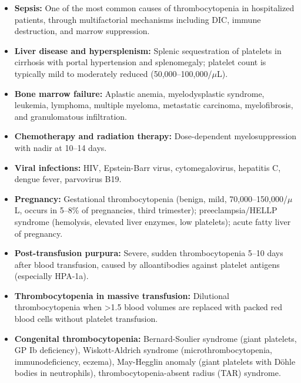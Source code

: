 \begin{itemize}
  \item \textbf{Sepsis:} One of the most common causes of thrombocytopenia in hospitalized patients, through multifactorial mechanisms including DIC, immune destruction, and marrow suppression.
  \item \textbf{Liver disease and hypersplenism:} Splenic sequestration of platelets in cirrhosis with portal hypertension and splenomegaly; platelet count is typically mild to moderately reduced (50,000--100,000/$\mu$L).
  \item \textbf{Bone marrow failure:} Aplastic anemia, myelodysplastic syndrome, leukemia, lymphoma, multiple myeloma, metastatic carcinoma, myelofibrosis, and granulomatous infiltration.
  \item \textbf{Chemotherapy and radiation therapy:} Dose-dependent myelosuppression with nadir at 10--14 days.
  \item \textbf{Viral infections:} HIV, Epstein-Barr virus, cytomegalovirus, hepatitis C, dengue fever, parvovirus B19.
  \item \textbf{Pregnancy:} Gestational thrombocytopenia (benign, mild, 70,000--150,000/$\mu$L, occurs in 5--8\% of pregnancies, third trimester); preeclampsia/HELLP syndrome (hemolysis, elevated liver enzymes, low platelets); acute fatty liver of pregnancy.
  \item \textbf{Post-transfusion purpura:} Severe, sudden thrombocytopenia 5--10 days after blood transfusion, caused by alloantibodies against platelet antigens (especially HPA-1a).
  \item \textbf{Thrombocytopenia in massive transfusion:} Dilutional thrombocytopenia when >1.5 blood volumes are replaced with packed red blood cells without platelet transfusion.
  \item \textbf{Congenital thrombocytopenia:} Bernard-Soulier syndrome (giant platelets, GP Ib deficiency), Wiskott-Aldrich syndrome (microthrombocytopenia, immunodeficiency, eczema), May-Hegglin anomaly (giant platelets with D\"{o}hle bodies in neutrophils), thrombocytopenia-absent radius (TAR) syndrome.
\end{itemize}

